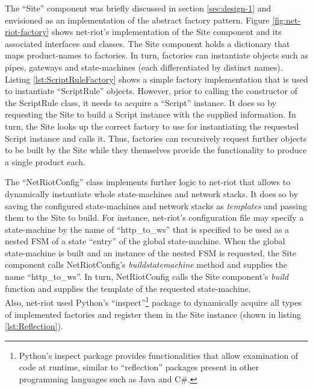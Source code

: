 The \enquote{Site} component was briefly discussed in section \ref{sec:design-1} and envisioned as an implementation of the abstract factory pattern. Figure \ref{fig:net-riot-factory} shows net-riot's implementation of the Site component and its associated interfaces and classes. The Site component holds a dictionary that maps product-names to factories. In turn, factories can instantiate objects such as pipes, gateways and state-machines (each differentiated by distinct names). Listing \ref{lst:ScriptRuleFactory} shows a simple factory implementation that is used to instantiate \enquote{ScriptRule} objects. However, prior to calling the constructor of the ScriptRule class, it needs to acquire a \enquote{Script} instance. It does so by requesting the Site to build a Script instance with the supplied information. In turn, the Site looks up the correct factory to use for instantiating the requested Script instance and calls it. Thus, factories can recursively request further objects to be built by the Site while they themselves provide the functionality to produce a single product each.

The \enquote{NetRiotConfig} class implements further logic to net-riot that allows to dynamically instantiate whole state-machines and network stacks. It does so by saving the configured state-machines and network stacks as \emph{templates} and passing them to the Site to build. For instance, net-riot's configuration file may specify a state-machine by the name of \enquote{http\_to\_ws} that is specified to be used as a nested \ac{FSM} of a state \enquote{entry} of the global state-machine. When the global state-machine is built and an instance of the nested \ac{FSM} is requested, the Site component calls NetRiotConfig's \emph{buildstatemachine} method and supplies the name \enquote{http\_to\_ws}. In turn, NetRiotConfig calls the Site component's \emph{build} function and supplies the template of the requested state-machine.\\
Also, net-riot used Python's \enquote{inspect}\footnote{Python's inspect package provides functionalities that allow examination of code at runtime, similar to \enquote{reflection} packages present in other programming languages such as Java and C\#.} package to dynamically acquire all types of implemented factories and register them in the Site instance (shown in listing \ref{lst:Reflection}).

